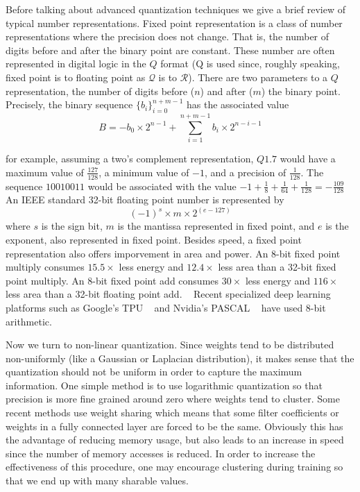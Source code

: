 Before talking about advanced quantization techniques we give a brief review of typical number representations.  Fixed point representation is a class of number representations where the precision does not change.  That is, the number of digits before and after the binary point are constant.  These number are often represented in digital logic in the $Q$ format (Q is used since, roughly speaking, fixed point is to floating point as $\mathcal{Q}$ is to $\mathcal{R}$).  There are two parameters to a $Q$ representation, the number of digits before ($n$) and after ($m$) the binary point.  Precisely, the binary sequence $\{b_i\}_{i=0}^{n+m-1}$ has the associated value
$$ B = - b_0\times 2^{n-1} + \sum_{i=1}^{n+m-1} b_i \times 2^{n-i-1}$$

for example, assuming a two's complement representation, $Q1.7$ would have a maximum value of $\frac{127}{128}$, a minimum value of $-1$, and a precision of $\frac{1}{128}$.  The sequence $10010011$ would be associated with the value $-1 + \frac{1}{8} + \frac{1}{64} + \frac{1}{128} = -\frac{109}{128}$ 
An IEEE standard 32-bit floating point number is represented by 
$$ (-1)^s \times m \times 2^{(e-127)}$$
where $s$ is the sign bit, $m$ is the mantissa represented in fixed point, and $e$ is the exponent, also represented in fixed point.  Besides speed, a fixed point representation also offers imporvement in area and power.  An 8-bit fixed point multiply consumes $15.5 \times$ less energy and $12.4\times$ less area than a 32-bit fixed point multiply.  An 8-bit fixed point add consumes $30\times$ less energy and $116\times$ less area than a 32-bit floating point add. ~\cite{Horowitz}  Recent specialized deep learning platforms such as Google's TPU ~\cite{DBLP:journals/corr/JouppiYPPABBBBB17} and Nvidia's PASCAL ~\cite{PASCAL} have used 8-bit arithmetic.

Now we turn to non-linear quantization.  Since weights tend to be distributed non-uniformly (like a Gaussian or Laplacian distribution), it makes sense that the quantization should not be uniform in order to capture the maximum information.  One simple method is to use logarithmic quantization so that precision is more fine grained around zero where weights tend to cluster.  Some recent methods use weight sharing which means that some filter coefficients or weights in a fully connected layer are forced to be the same.  Obviously this has the advantage of reducing memory usage, but also leads to an increase in speed since the number of memory accesses is reduced.  In order to increase the effectiveness of this procedure, one may encourage clustering during training so that we end up with many sharable values. ~\cite{DBLP:journals/corr/HanMD15}


